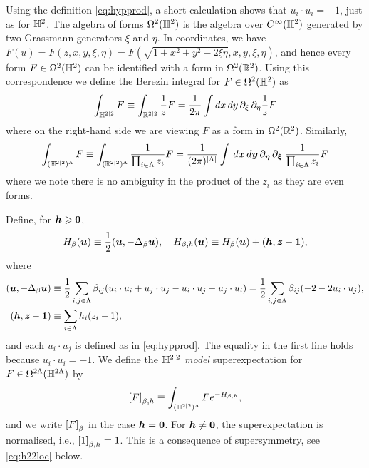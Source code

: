 \documentclass[11pt,a4paper]{article}
\begin{document}
Using the definition \eqref{eq:hypprod}, a short calculation shows that
$u_{i}\cdot u_{i} = -1$, just as for $\mathbb{H}^{2}$.
The algebra of forms $\Omega^{2}(\mathbb{H}^{2})$ is the algebra over $C^{\infty}(\mathbb{H}^{2})$ generated by two Grassmann generators $\xi$ and $\eta$.
In coordinates, we have $F(u) = F(z,x,y,\xi,\eta) = F(\sqrt{1+x^{2}+{y}^{2} - 2{\xi}{\eta}}, x,y,\xi,\eta)$,
and hence every form $F\in \Omega^{2}(\mathbb{H}^{2})$ can be identified with a form in $\Omega^{2}(\mathbb{R}^{2})$.
Using this correspondence 
we define the Berezin integral for $F\in \Omega^{2}(\mathbb{H}^{2})$ as
\begin{equation}
  \label{eq:H22int}
  \int_{\mathbb{H}^{2|2}}F \equiv \int_{\mathbb{R}^{2|2}} \frac{1}{z} F = \frac{1}{2\pi}
    \int dx\,dy\, \partial_{\xi}\, \partial_{\eta}  \frac{1}{z} F
\end{equation}
where on the right-hand side
we are viewing $F$ as a form in $\Omega^2(\mathbb{R}^{2})$. Similarly,
\begin{equation}
  \label{eq:H22-int-L}
  \int_{(\mathbb{H}^{2|2})^{\Lambda}}F \equiv
  \int_{(\mathbb{R}^{2|2})^{\Lambda}} \frac{1}{\prod_{i\in\Lambda} z_{i}} F
  =
  \frac{1}{(2\pi)^{|\Lambda|}} \int\, d\boldsymbol{x}\,d\boldsymbol{y}\, \partial_{\boldsymbol{\eta}}\,\partial_{\boldsymbol{\xi}}\;\frac{1}{\prod_{i\in\Lambda} z_{i}}F
\end{equation}
where we note there is no ambiguity in the product of the $z_{i}$ as they
are even forms.


Define, for $\boldsymbol{h}\geqslant \boldsymbol{0}$,
\begin{equation}
  \label{eq:H22-def}
  H_{\beta}(\boldsymbol{u}) \equiv \frac{1}{2}(\boldsymbol{u},-\Delta_{\beta}\boldsymbol{u}),
  \quad H_{\beta,h}(\boldsymbol{u}) \equiv H_{\beta}(\boldsymbol{u}) + (\boldsymbol{h},\boldsymbol{z}-\boldsymbol{1}), 
\end{equation}
where
\begin{equation}
  \label{eq:H22-Lap}
  \begin{split}
    (\boldsymbol{u},-\Delta_{\beta}\boldsymbol{u}) 
    &\equiv
    \frac{1}{2}\sum_{i,j\in\Lambda} \beta_{ij}( u_{i}\cdot u_{i} + u_{j}\cdot u_{j} - u_{i}\cdot u_{j} - u_j \cdot u_i)
    =
    \frac{1}{2}\sum_{i,j\in\Lambda} \beta_{ij}( -2 - 2 u_{i}\cdot u_{j}),
    \\
    (\boldsymbol{h},\boldsymbol{z}-\boldsymbol{1}) &\equiv \sum_{i\in\Lambda}h_{i}(z_{i}-1),
    \end{split}
\end{equation}
and each $u_{i}\cdot u_{j}$ is defined as in \eqref{eq:hypprod}.
The equality in the first line holds because $u_i\cdot u_i =-1$.
We define the \emph{$\mathbb{H}^{2|2}$ model} superexpectation for $F\in \Omega^{2\Lambda}(\mathbb{H}^{2\Lambda})$ by
\begin{equation}
    \label{eq:SGFF-Hyp}
  \uspin{F}_{\beta,h}\bydef
  \int_{(\HH^{2|2})^{\Lambda}}F e^{-H_{\beta,h}},
\end{equation}
and we write $\cb{F}_{\beta}$ in the case $\boldsymbol{h}=\boldsymbol{0}$.
For $\boldsymbol{h} \neq \boldsymbol{0}$, the superexpectation is normalised, i.e.,
$\uspin{1}_{\beta,h}=1$. This is a consequence of supersymmetry, 
see \eqref{eq:h22loc} below.
\end{document}
